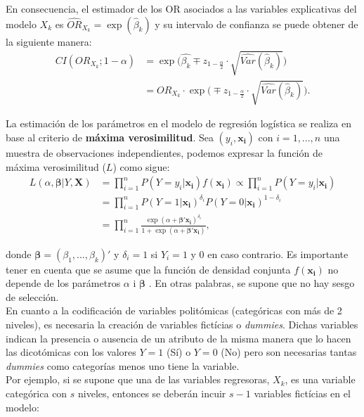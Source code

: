 En consecuencia, el estimador de los OR asociados a las variables explicativas del modelo $X_k$ es $\widehat{OR}_{X_k}=\exp(\hat{\beta}_k)$ y su intervalo de confianza se puede obtener de la siguiente manera:
\begin{align*}
CI(OR_{X_k};1-\alpha)
& =\exp \big( \hat{\beta_k} \mp z_{1-\frac{\alpha}{2}} \cdot \sqrt{\widehat{Var}(\hat{\beta}_k)} \big) \\
& =OR_{X_k} \cdot \exp \big(  \mp z_{1-\frac{\alpha}{2}} \cdot \sqrt{\widehat{Var}(\hat{\beta}_k)}\big).
\end{align*}

La estimación de los parámetros en el modelo de regresión logística se realiza en base al criterio de \textbf{máxima verosimilitud}. Sea $(y_i, \boldsymbol{x_i})$ con $i=1,...,n$ una muestra de observaciones independientes, podemos expresar la función de máxima verosimilitud ($L$) como sigue:
\begin{align*}
 L(\alpha, \boldsymbol{\beta} | Y, \boldsymbol{X})
 &=\prod_{i=1}^{n}P(Y=y_i|\boldsymbol{x_i})f(\boldsymbol{x_i})\propto \prod_{i=1}^{n}P(Y=y_i|\boldsymbol{x_i})\\[1ex]
 & =\prod_{i=1}^{n}P(Y=1|\boldsymbol{x_i})^{\delta_i}P(Y=0|\boldsymbol{x_i})^{1-\delta_i} \\[1ex]
 & =\prod_{i=1}^{n}\frac{\exp(\alpha + \boldsymbol{\beta'x_i})^{\delta_i}}{1+\exp(\alpha + \boldsymbol{\beta'x_i})},
\end{align*}

donde $\boldsymbol{\beta}=(\beta_1, ..., \beta_k)'$ y $\delta_i=1$ si $Y_i=1$ y 0 en caso contrario. Es importante tener en cuenta que se asume que la función de densidad conjunta $f(\boldsymbol{x_i})$ no depende de los parámetros $\alpha$ i $\boldsymbol{\beta}$ \autocite{Silvia}. En otras palabras, se supone que no hay sesgo de selección. \\

En cuanto a la codificación de variables politómicas (categóricas con más de 2 niveles), es necesaria la creación de variables fictícias o \textit{dummies}. Dichas variables indican la presencia o ausencia de un atributo de la misma manera que lo hacen las dicotómicas con los valores $Y=1$ (Sí) o $Y=0$ (No) pero son necesarias tantas \textit{dummies} como categorías menos uno tiene la variable. \\

Por ejemplo, si se supone que una de las variables regresoras, $X_k$, es una variable categórica con $s$ niveles, entonces se deberán incuir $s-1$ variables fictícias en el modelo:

